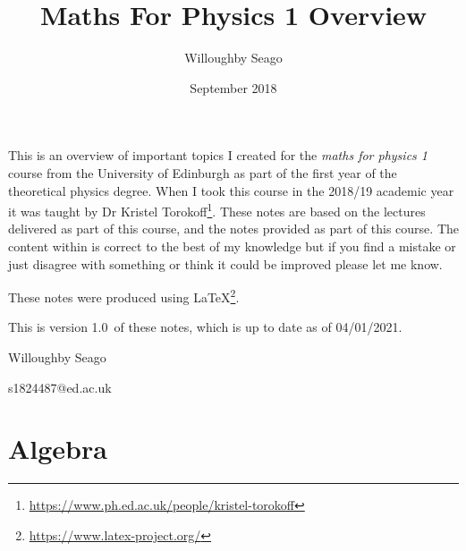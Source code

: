 \documentclass{article}
\author{Willoughby Seago}
\title{Maths For Physics 1 Overview}
\date{September 2018}
\newcommand{\notesVersion}{1.0}
\newcommand{\notesDate}{04/01/2021}
\begin{document}
\maketitle
This is an overview of important topics I created for the \textit{maths for physics 1} course from the University of Edinburgh as part of the first year of the theoretical physics degree.
When I took this course in the 2018/19 academic year it was taught by Dr Kristel Torokoff\footnote{\url{https://www.ph.ed.ac.uk/people/kristel-torokoff}}.
These notes are based on the lectures delivered as part of this course, and the notes provided as part of this course.
The content within is correct to the best of my knowledge but if you find a mistake or just disagree with something or think it could be improved please let me know.

These notes were produced using \LaTeX\footnote{\url{https://www.latex-project.org/}}.

This is version \notesVersion~of these notes, which is up to date as of \notesDate.
\begin{flushright}
    Willoughby Seago
    
    s1824487@ed.ac.uk
\end{flushright}
\clearpage
\section*{Algebra}
\end{document}
